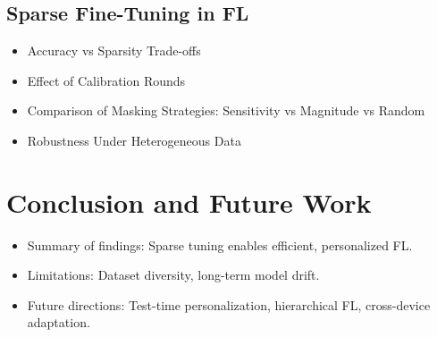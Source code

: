 \documentclass[10pt,twocolumn,letterpaper]{article}
\begin{document}
\subsection{Sparse Fine-Tuning in FL}
\begin{itemize}
    \item Accuracy vs Sparsity Trade-offs
    \item Effect of Calibration Rounds
    \item Comparison of Masking Strategies: Sensitivity vs Magnitude vs Random
    \item Robustness Under Heterogeneous Data
\end{itemize}

\section{Conclusion and Future Work}
\label{sec:conclusion}
\begin{itemize}
    \item Summary of findings: Sparse tuning enables efficient, personalized FL.
    \item Limitations: Dataset diversity, long-term model drift.
    \item Future directions: Test-time personalization, hierarchical FL, cross-device adaptation.
\end{itemize}

{\small


}
\end{document}
